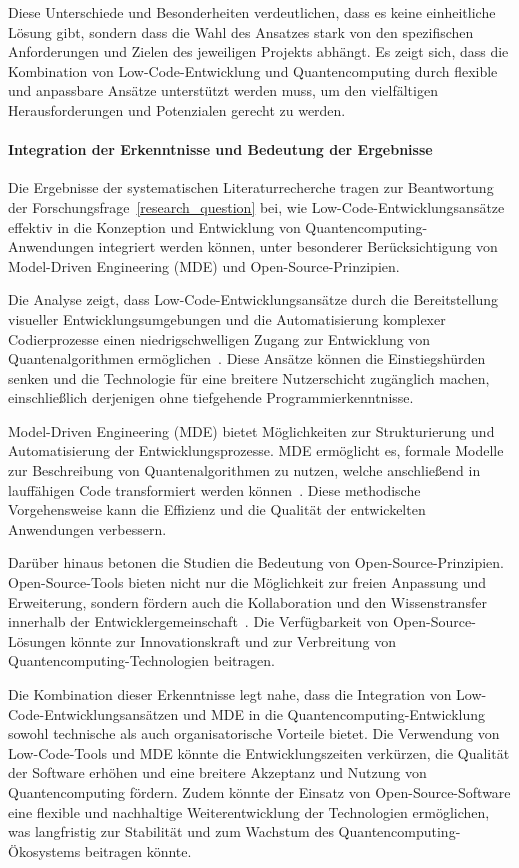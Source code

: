 Diese Unterschiede und Besonderheiten verdeutlichen, dass es keine einheitliche Lösung gibt, sondern dass die Wahl 
des Ansatzes stark von den spezifischen Anforderungen und Zielen des jeweiligen Projekts abhängt. Es zeigt sich, dass 
die Kombination von Low-Code-Entwicklung und Quantencomputing durch flexible und anpassbare Ansätze unterstützt werden 
muss, um den vielfältigen Herausforderungen und Potenzialen gerecht zu werden.

\paragraph{Integration der Erkenntnisse und Bedeutung der Ergebnisse}

Die Ergebnisse der systematischen Literaturrecherche tragen zur Beantwortung der Forschungsfrage~\ref{research_question} bei, 
wie Low-Code-Entwicklungsansätze effektiv in die Konzeption und Entwicklung von Quantencomputing-Anwendungen 
integriert werden können, unter besonderer Berücksichtigung von Model-Driven Engineering (MDE) und Open-Source-Prinzipien.

Die Analyse zeigt, dass Low-Code-Entwicklungsansätze durch die Bereitstellung visueller Entwicklungsumgebungen 
und die Automatisierung komplexer Codierprozesse einen niedrigschwelligen Zugang zur Entwicklung von 
Quantenalgorithmen ermöglichen~\cite{Sahay_2020, Bock_2021}. Diese Ansätze können die Einstiegshürden senken und 
die Technologie für eine breitere Nutzerschicht zugänglich machen, einschließlich derjenigen ohne tiefgehende 
Programmierkenntnisse.

Model-Driven Engineering (MDE) bietet Möglichkeiten zur Strukturierung und Automatisierung der Entwicklungsprozesse. 
MDE ermöglicht es, formale Modelle zur Beschreibung von Quantenalgorithmen zu nutzen, welche anschließend in 
lauffähigen Code transformiert werden können~\cite{Gemeinhardt_2021, Perez-Castillo_2022}. Diese methodische 
Vorgehensweise kann die Effizienz und die Qualität der entwickelten Anwendungen verbessern.

Darüber hinaus betonen die Studien die Bedeutung von Open-Source-Prinzipien. Open-Source-Tools bieten nicht nur 
die Möglichkeit zur freien Anpassung und Erweiterung, sondern fördern auch die Kollaboration und den Wissenstransfer 
innerhalb der Entwicklergemeinschaft~\cite{Amato_2023, Ahmad_2023}. Die Verfügbarkeit von Open-Source-Lösungen 
könnte zur Innovationskraft und zur Verbreitung von Quantencomputing-Technologien beitragen.

Die Kombination dieser Erkenntnisse legt nahe, dass die Integration von Low-Code-Entwicklungsansätzen und MDE in 
die Quantencomputing-Entwicklung sowohl technische als auch organisatorische Vorteile bietet. Die Verwendung von 
Low-Code-Tools und MDE könnte die Entwicklungszeiten verkürzen, die Qualität der Software erhöhen und eine breitere 
Akzeptanz und Nutzung von Quantencomputing fördern. Zudem könnte der Einsatz von Open-Source-Software eine flexible 
und nachhaltige Weiterentwicklung der Technologien ermöglichen, was langfristig zur Stabilität und zum Wachstum des 
Quantencomputing-Ökosystems beitragen könnte.

